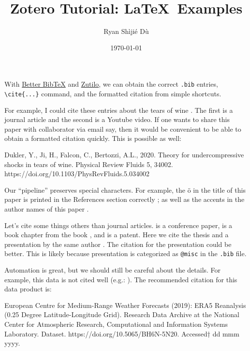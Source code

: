 \documentclass[11pt,letterpaper]{article}
\title{Zotero Tutorial: \LaTeX\ Examples}
\author{Ryan Sh\`iji\'e D\`u}
\date{\today}
\begin{document}


\maketitle

With 
\href{https://retorque.re/zotero-better-bibtex/}{Better BibTeX}
and 
\href{https://github.com/wshanks/Zutilo}{Zutilo}, we can obtain the correct \texttt{.bib} entries, \verb|\cite{...}| command, and the formatted citation from simple shortcuts. 

For example, I could cite these entries about the tears of wine \parencite{DuklerEtAl_20, PhysicsGirl_19}. The first is a journal article and the second is a Youtube video. If one wants to share this paper with collaborator via email say, then it would be convenient to be able to obtain a formatted citation quickly. This is possible as well:\vspace*{2mm}\\
\;\hspace*{1cm}
\begin{minipage}{.85\textwidth}
    Dukler, Y., Ji, H., Falcon, C., Bertozzi, A.L., 2020. Theory for undercompressive shocks in tears of wine. Physical Review Fluids 5, 34002. https://doi.org/10.1103/PhysRevFluids.5.034002
\end{minipage}

Our ``pipeline'' preserves special characters. For example, the \"o in the title of this paper is printed in the References section correctly \parencite{Vanneste_21}; as well as the accents in the author names of this paper \parencite{Caspar-CohenEtAl_21}.

Let's cite some things others than journal articles. \cite{Diamantakis_14} is a conference paper, \cite{Buhler_14b} is a book chapter from the book \cite{Buhler_14}, and \cite{TERANEtAl_18} is a patent. Here we cite the thesis and a presentation by the same author \parencite{Shakespeare_15,Shakespeare_21}. The citation for the presentation could be better. This is likely because presentation is categorized as \verb|@misc| in the \texttt{.bib} file. 

Automation is great, but we should still be careful about the details. For example, this data is not cited well (e.g.: \cite{cisl_rda_ds633.3}). The recommended citation for this data product is:\vspace*{2mm}\\
\;\hspace*{1cm}
\begin{minipage}{.85\textwidth}%
European Centre for Medium-Range Weather Forecasts (2019): ERA5 Reanalysis (0.25 Degree Latitude-Longitude Grid). Research Data Archive at the National Center for Atmospheric Research, Computational and Information Systems Laboratory. Dataset. https://doi.org/10.5065/BH6N-5N20. Accessed† dd mmm yyyy.
\end{minipage}%
\end{document}
